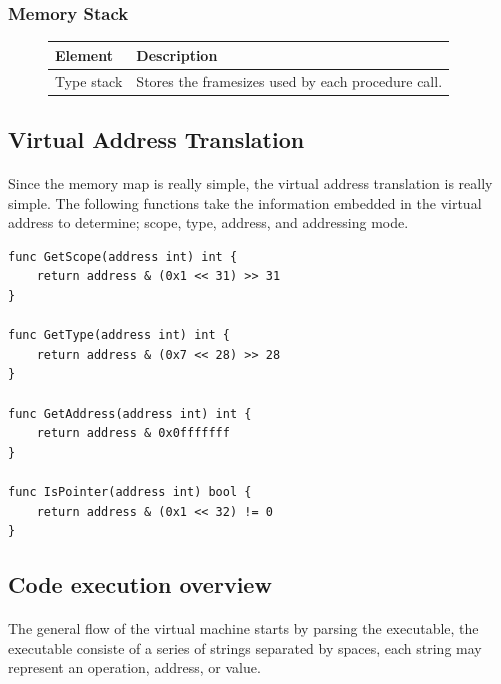 \subsubsection{Memory Stack}

\begin{figure}[h]
    \centering
    \begin{tabular}{p{1in}p{3in}}
        \toprule
        \textbf{Element} & \textbf{Description}\\
        \midrule Type stack &
        Stores the framesizes used by each procedure call.\\
        
        \bottomrule
    \end{tabular}
\end{figure}

\newpage

\subsection{Virtual Address Translation}

\paragraph{} Since the memory map is really simple, the virtual address
translation is really simple. The following functions take the information
embedded in the virtual address to determine; scope, type, address, and
addressing mode.

\begin{verbatim}
func GetScope(address int) int {
    return address & (0x1 << 31) >> 31
}

func GetType(address int) int {
    return address & (0x7 << 28) >> 28
}

func GetAddress(address int) int {
    return address & 0x0fffffff
}

func IsPointer(address int) bool {
    return address & (0x1 << 32) != 0
}

\end{verbatim}

\subsection{Code execution overview}

\paragraph{} The general flow of the virtual machine starts by parsing the 
executable, the executable consiste of a series of strings separated by spaces,
each string may represent an operation, address, or value.

